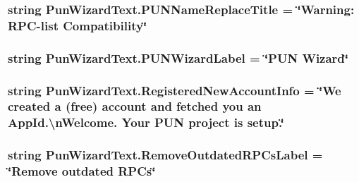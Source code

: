 \subsubsection[{\texorpdfstring{P\+U\+N\+Name\+Replace\+Title}{PUNNameReplaceTitle}}]{\setlength{\rightskip}{0pt plus 5cm}string Pun\+Wizard\+Text.\+P\+U\+N\+Name\+Replace\+Title = \char`\"{}Warning\+: R\+PC-\/list Compatibility\char`\"{}}\hypertarget{class_pun_wizard_text_a645cbabea2e9ffdad71e2689d137ce54}{}\label{class_pun_wizard_text_a645cbabea2e9ffdad71e2689d137ce54}
\subsubsection[{\texorpdfstring{P\+U\+N\+Wizard\+Label}{PUNWizardLabel}}]{\setlength{\rightskip}{0pt plus 5cm}string Pun\+Wizard\+Text.\+P\+U\+N\+Wizard\+Label = \char`\"{}P\+UN Wizard\char`\"{}}\hypertarget{class_pun_wizard_text_aca0372a55e64a97efa52bf6d9cba5cd9}{}\label{class_pun_wizard_text_aca0372a55e64a97efa52bf6d9cba5cd9}
\subsubsection[{\texorpdfstring{Registered\+New\+Account\+Info}{RegisteredNewAccountInfo}}]{\setlength{\rightskip}{0pt plus 5cm}string Pun\+Wizard\+Text.\+Registered\+New\+Account\+Info = \char`\"{}We created a (free) account and fetched you an App\+Id.\textbackslash{}n\+Welcome. Your P\+UN project is setup.\char`\"{}}\hypertarget{class_pun_wizard_text_a646ee360759be07d62f726e71e2b60cf}{}\label{class_pun_wizard_text_a646ee360759be07d62f726e71e2b60cf}
\subsubsection[{\texorpdfstring{Remove\+Outdated\+R\+P\+Cs\+Label}{RemoveOutdatedRPCsLabel}}]{\setlength{\rightskip}{0pt plus 5cm}string Pun\+Wizard\+Text.\+Remove\+Outdated\+R\+P\+Cs\+Label = \char`\"{}Remove outdated R\+P\+Cs\char`\"{}}\hypertarget{class_pun_wizard_text_accdbd125183979cb39ee61448e048aa4}{}\label{class_pun_wizard_text_accdbd125183979cb39ee61448e048aa4}
